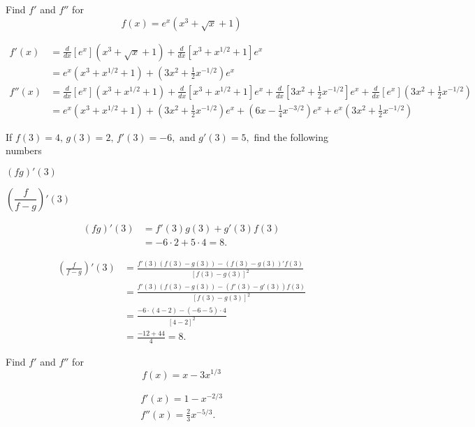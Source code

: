 \documentclass[unboxed]{hwset}
\begin{document}
\begin{problem}[3.] 
	Find $f'$ and $f''$ for
	\begin{equation*}
		f(x) = e^{x}(x^3 + \sqrt{x} +1)
	\end{equation*}
\end{problem}

\begin{solution}
	\begin{align*}
		f'(x) &= \frac{d}{dx}[e^x](x^3+\sqrt{x}+1) + \frac{d}{dx}[x^3+x^{1/2}+1]e^x \\
			&= \boxed{e^x(x^3+x^{1/2}+1) + (3x^2+\frac{1}{2}x^{-1/2})e^x} \\
		f''(x) &= \frac{d}{dx}[e^x](x^3+x^{1/2}+1)+\frac{d}{dx}[x^3+x^{1/2}+1]e^x +
			\frac{d}{dx}[3x^2+\frac{1}{2}x^{-1/2}]e^x +
			\frac{d}{dx}[e^x](3x^2+\frac{1}{2}x^{-1/2}) \\
		&= \boxed{e^x(x^3+x^{1/2}+1)+(3x^2+\frac{1}{2}x^{-1/2})e^x +
			(6x-\frac{1}{4}x^{-3/2})e^x + e^x(3x^2+\frac{1}{2}x^{-1/2})}
	\end{align*}
\end{solution}

\begin{problem}[4.] 
	If $f(3) = 4,\, g(3) = 2,\, f'(3) = -6, \text{ and } g'(3) = 5,$ find the
	following numbers
	\be
		\item $(fg)'(3)$
		\item $\left(\dfrac{f}{f-g}\right)'(3)$
	\ee
\end{problem}

\be
	\item
	\begin{solution}
		\begin{align*}
			(fg)'(3) &= f'(3)g(3)+g'(3)f(3) \\
			&= -6\cdot 2 + 5\cdot 4 = \boxed{8.}
		\end{align*}
	\end{solution}
	\item
	\begin{solution}
		\begin{align*}
			\left(\frac{f}{f-g}\right)'(3) &= \frac{f'(3)(f(3)-g(3)) - (f(3)-g(3))'
				f(3)}{[f(3)-g(3)]^2} \\
			&= \frac{f'(3)(f(3)-g(3)) - (f'(3) - g'(3)) f(3)}{[f(3)-g(3)]^2} \\
			&= \frac{-6\cdot(4-2) - (-6 - 5)\cdot 4}{[4-2]^2} \\
			&= \frac{-12 + 44}{4} = \boxed{8.} 
		\end{align*}
	\end{solution}
\ee

\begin{problem}[5.]
	Find $f'$ and $f''$ for
	\begin{equation*}
		f(x) = x - 3x^{1/3}
	\end{equation*}
\end{problem}

\begin{solution}
	\begin{align*}
		\boxed{f'(x) = 1 - x^{-2/3}} \\
		\boxed{f''(x) = \frac{2}{3} x^{-5/3}.}
	\end{align*}
\end{solution}
\end{document}

